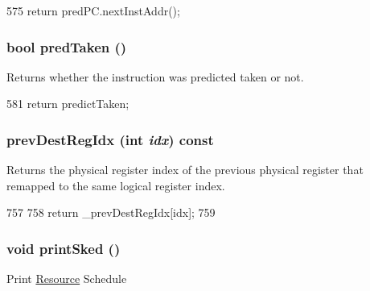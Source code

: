 \begin{DoxyCode}
575 { return predPC.nextInstAddr(); }
\end{DoxyCode}
\hypertarget{classInOrderDynInst_af7972cc57ec6d3c569bad2bc64a5183a}{
\subsubsection[{predTaken}]{\setlength{\rightskip}{0pt plus 5cm}bool predTaken ()}}
\label{classInOrderDynInst_af7972cc57ec6d3c569bad2bc64a5183a}
Returns whether the instruction was predicted taken or not. 


\begin{DoxyCode}
581 { return predictTaken; }
\end{DoxyCode}
\hypertarget{classInOrderDynInst_a0e34129e87398c9ff1f764e577b7b79f}{
\subsubsection[{prevDestRegIdx}]{ prevDestRegIdx (int {\em idx}) const}}
\label{classInOrderDynInst_a0e34129e87398c9ff1f764e577b7b79f}
Returns the physical register index of the previous physical register that remapped to the same logical register index. 


\begin{DoxyCode}
757     {
758         return _prevDestRegIdx[idx];
759     }
\end{DoxyCode}
\hypertarget{classInOrderDynInst_af00b2d517cd8e4731bb364323a9dfeb4}{
\subsubsection[{printSked}]{\setlength{\rightskip}{0pt plus 5cm}void printSked ()}}
\label{classInOrderDynInst_af00b2d517cd8e4731bb364323a9dfeb4}
Print \hyperlink{classResource}{Resource} Schedule 


